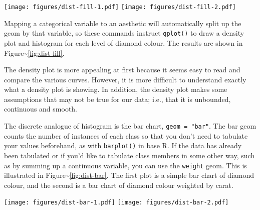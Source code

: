 \texttt{[image: figures/dist-fill-1.pdf]}
\texttt{[image: figures/dist-fill-2.pdf]}

\noindent Mapping a categorical variable to an aesthetic will
automatically split up the geom by that variable, so these commands
instruct \texttt{qplot()} to draw a density plot and histogram for each
level of diamond colour. The results are shown in
Figure\textasciitilde{}\ref{fig:dist-fill}.

The density plot is more appealing at first because it seems easy to
read and compare the various curves. However, it is more difficult to
understand exactly what a density plot is showing. In addition, the
density plot makes some assumptions that may not be true for our data;
i.e., that it is unbounded, continuous and smooth.


The discrete analogue of histogram is the bar chart,
\texttt{geom = "bar"}. The bar geom counts the number of instances of
each class so that you don't need to tabulate your values beforehand, as
with \texttt{barplot()} in base R. If the data has already been
tabulated or if you'd like to tabulate class members in some other way,
such as by summing up a continuous variable, you can use the
\texttt{weight} geom. This is illustrated in
Figure\textasciitilde{}\ref{fig:dist-bar}. The first plot is a simple
bar chart of diamond colour, and the second is a bar chart of diamond
colour weighted by carat.  

\begin{Shaded}
\begin{Highlighting}[]
  \NormalTok{)}
  \NormalTok{, } 
\StringTok{  }\NormalTok{(}\NormalTok{)}
\end{Highlighting}
\end{Shaded}

\texttt{[image: figures/dist-bar-1.pdf]}
\texttt{[image: figures/dist-bar-2.pdf]}



